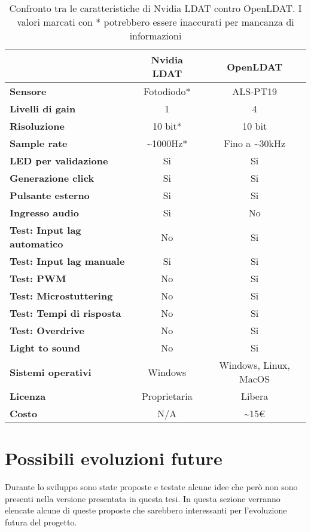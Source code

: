 \begin{table}[h!]
	\centering
	\begin{tabular}{|l|c|c|} 
		\hline
		& \textbf{Nvidia LDAT} & \textbf{OpenLDAT}  \\ 
		\hline
		\textbf{Sensore} & Fotodiodo* & ALS-PT19 \\
		\hline
		\textbf{Livelli di gain} & 1 & 4 \\
		\hline
		\textbf{Risoluzione} & 10 bit* & 10 bit \\
		\hline
		\textbf{Sample rate} & \textasciitilde 1000Hz* & Fino a \textasciitilde 30kHz \\
		\hline
		\textbf{LED per validazione} & Si & Si \\
		\hline
		\textbf{Generazione click} & Si & Si \\
		\hline
		\textbf{Pulsante esterno} & Si & Si \\
		\hline
		\textbf{Ingresso audio} & Si & No \\
		\hline
		\textbf{Test: Input lag automatico} & No & Si \\
		\hline
		\textbf{Test: Input lag manuale} & Si & Si \\
		\hline
		\textbf{Test: PWM} & No & Si \\
		\hline
		\textbf{Test: Microstuttering} & No & Si \\
		\hline
		\textbf{Test: Tempi di risposta} & No & Si \\
		\hline
		\textbf{Test: Overdrive} & No & Si \\
		\hline
		\textbf{Light to sound} & No & Si \\
		\hline
		\textbf{Sistemi operativi} & Windows & Windows, Linux, MacOS \\
		\hline
		\textbf{Licenza} & Proprietaria & Libera \\
		\hline
		\textbf{Costo} & N/A & \textasciitilde 15€ \\
		\hline
	\end{tabular}
	\caption{\label{tab:openldat_nvidialdat_comparison}Confronto tra le caratteristiche di Nvidia LDAT contro OpenLDAT. I valori marcati con * potrebbero essere inaccurati per mancanza di informazioni}
\end{table}

\section{Possibili evoluzioni future}
Durante lo sviluppo sono state proposte e testate alcune idee che però non sono presenti nella versione presentata in questa tesi. In questa sezione verranno elencate alcune di queste proposte che sarebbero interessanti per l'evoluzione futura del progetto.

